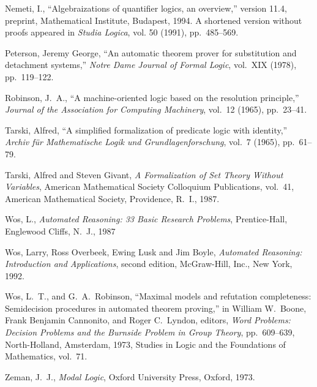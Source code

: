 \documentclass[leqno]{article}
\begin{document}
\begin{thebibliography}{99}

 Nemeti, I., ``Algebraizations of quantifier logics, an
overview,'' version 11.4, preprint, Mathematical Institute, Budapest, 1994.
A shortened version without proofs appeared in {\em Studia Logica}, vol. 50
(1991), pp.\ 485--569.

 Peterson, Jeremy George, ``An automatic theorem prover for
substitution  and detachment systems,'' {\em Notre Dame Journal of Formal
Logic}, vol.\ XIX  (1978), pp.\ 119--122.

 Robinson, J.~A., ``A machine-oriented logic based on the
resolution  principle,'' {\em Journal of the Association for Computing
Machinery}, vol.\ 12  (1965), pp.\ 23--41.

 Tarski, Alfred, ``A simplified formalization of predicate
logic with  identity,'' {\em Archiv f{\"{u}}r Mathematische Logik und
Grundlagenforschung}, vol.\ 7 (1965), pp.\ 61--79.

 Tarski, Alfred and Steven Givant, {\em A Formalization of
Set Theory  Without Variables}, American Mathematical Society Colloquium
Publications,  vol.\ 41, American Mathematical Society, Providence, R.~I.,
1987.

 Wos, L., {\em Automated Reasoning: 33 Basic Research
Problems}, Prentice-Hall, Englewood Cliffs, N.~J., 1987

 Wos, Larry, Ross Overbeek, Ewing Lusk and Jim Boyle, {\em
Automated Reasoning:  Introduction and Applications}, second edition,
McGraw-Hill, Inc., New York, 1992.

 Wos, L.~T., and G.~A.~Robinson, ``Maximal models and refutation
completeness:  Semidecision procedures in automated theorem proving,'' in
William W.~Boone, Frank Benjamin Cannonito, and Roger C.~Lyndon, editors, {\em
Word Problems:  Decision Problems and the Burnside Problem in Group Theory},
pp.\ 609--639, North-Holland, Amsterdam, 1973, Studies in Logic and the
Foundations of Mathematics, vol.\ 71.

 Zeman, J.~J., {\em Modal Logic}, Oxford University Press,
Oxford, 1973.

\end{thebibliography}
\end{document}
